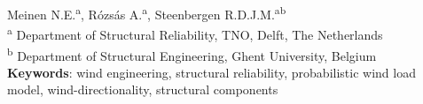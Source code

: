 \begin{centering}
\vspace{0.2cm}
Meinen N.E.\textsuperscript{a},  R\' ozs\'as A.\textsuperscript{a}, Steenbergen R.D.J.M.\textsuperscript{ab}\\
\vspace{0.2cm}
\textsuperscript{a} Department of Structural Reliability, TNO, Delft, The Netherlands\\
\textsuperscript{b} Department of Structural Engineering, Ghent University, Belgium\\
\vspace{0.2cm}
\textbf{Keywords}: wind engineering, structural reliability, probabilistic wind load model, wind-directionality, structural components
\end{centering}

%